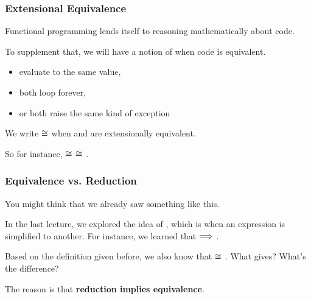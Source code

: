 \documentclass[aspectratio=169]{beamer}
\begin{document}
\begin{frame}[fragile]
  \frametitle{Extensional Equivalence}

  Functional programming lends itself to reasoning mathematically about code.

  \pause
  \vspace{5pt}

  To supplement that, we will have a notion of when code is equivalent.

  \pause
  \vspace{\fill}

  \begin{itemize}
    \item evaluate to the same value,
    \item both loop forever,
    \item or both raise the same kind of exception
  \end{itemize}

  \pause
  \vspace{5pt}

  We write  $\cong$  when  and  are extensionally equivalent.

  \vspace{\fill}

  So for instance,  $\cong$  $\cong$ .
\end{frame}

\begin{frame}[fragile]
  \frametitle{Equivalence vs. Reduction}

  You might think that we already saw something like this.

  \pause
  \vspace{\fill}

  In the last lecture, we explored the idea of , which
  is when an expression is simplified to another. For instance, we learned
  that  $\Longrightarrow$ .

  \pause
  \vspace{\fill}

  Based on the definition given before, we also know that  $\cong$
  . What gives? What's the difference?

  \pause
  \vspace{\fill}

  The reason is that \textbf{reduction implies equivalence}.
\end{frame}
\end{document}

